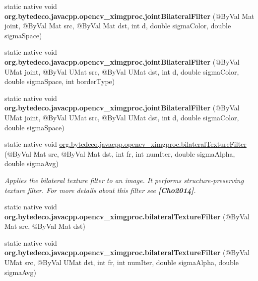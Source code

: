 \begin{DoxyCompactItemize}
\mbox{\label{group__ximgproc__filters_ga8a808c6b60409aafa2a0c8f318e46643}} 
static native void {\bfseries org.\+bytedeco.\+javacpp.\+opencv\+\_\+ximgproc.\+joint\+Bilateral\+Filter} (@By\+Val Mat joint, @By\+Val Mat src, @By\+Val Mat dst, int d, double sigma\+Color, double sigma\+Space)
\item 
\mbox{\label{group__ximgproc__filters_ga8d2b4a70f8a87566e3122eafc70c43e9}} 
static native void {\bfseries org.\+bytedeco.\+javacpp.\+opencv\+\_\+ximgproc.\+joint\+Bilateral\+Filter} (@By\+Val U\+Mat joint, @By\+Val U\+Mat src, @By\+Val U\+Mat dst, int d, double sigma\+Color, double sigma\+Space, int border\+Type)
\item 
\mbox{\label{group__ximgproc__filters_ga9a93ee0c6533cea2542fe4a1366dbe04}} 
static native void {\bfseries org.\+bytedeco.\+javacpp.\+opencv\+\_\+ximgproc.\+joint\+Bilateral\+Filter} (@By\+Val U\+Mat joint, @By\+Val U\+Mat src, @By\+Val U\+Mat dst, int d, double sigma\+Color, double sigma\+Space)
\item 
static native void \hyperlink{group__ximgproc__filters_ga369c99e9a5e13c93042c670509e04dfc}{org.\+bytedeco.\+javacpp.\+opencv\+\_\+ximgproc.\+bilateral\+Texture\+Filter} (@By\+Val Mat src, @By\+Val Mat dst, int fr, int num\+Iter, double sigma\+Alpha, double sigma\+Avg)
\begin{DoxyCompactList}\small\item\em Applies the bilateral texture filter to an image. It performs structure-\/preserving texture filter. For more details about this filter see {\bfseries [Cho2014]}. \end{DoxyCompactList}\item 
\mbox{\label{group__ximgproc__filters_ga0c62fac1c53f7f094979e09914d5f1b9}} 
static native void {\bfseries org.\+bytedeco.\+javacpp.\+opencv\+\_\+ximgproc.\+bilateral\+Texture\+Filter} (@By\+Val Mat src, @By\+Val Mat dst)
\item 
\mbox{\label{group__ximgproc__filters_ga541e86664c05cb2f109881c433e08a4f}} 
static native void {\bfseries org.\+bytedeco.\+javacpp.\+opencv\+\_\+ximgproc.\+bilateral\+Texture\+Filter} (@By\+Val U\+Mat src, @By\+Val U\+Mat dst, int fr, int num\+Iter, double sigma\+Alpha, double sigma\+Avg)

\end{DoxyCompactItemize}
